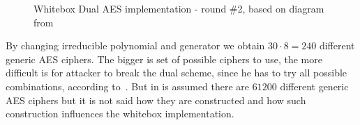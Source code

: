 \documentclass[11pt,oneside,final]{fithesis2}
\begin{document}
	\begin{figure}
	\begin{center}
	\leavevmode
	\centerline{}
	\end{center}
	\caption{Whitebox Dual AES implementation - round \#2, based on diagram from~\citep{Muir_atutorial}}
	\label{fig:wbaesdual}
	\end{figure}
	
	By changing irreducible polynomial and generator we obtain $30 \cdot 8 = 240$ different generic AES ciphers. The bigger is set of possible ciphers to use, the more difficult is
	for attacker to break the dual scheme, since he has to try all possible combinations, according to~\citep{Karroumi:2010:PWA:2041036.2041060}. But in 
	\citep{Karroumi:2010:PWA:2041036.2041060} is assumed there are $61200$ different generic AES ciphers but it is not said how they are constructed and how 
	such construction influences the whitebox implementation.
	
\end{document}
